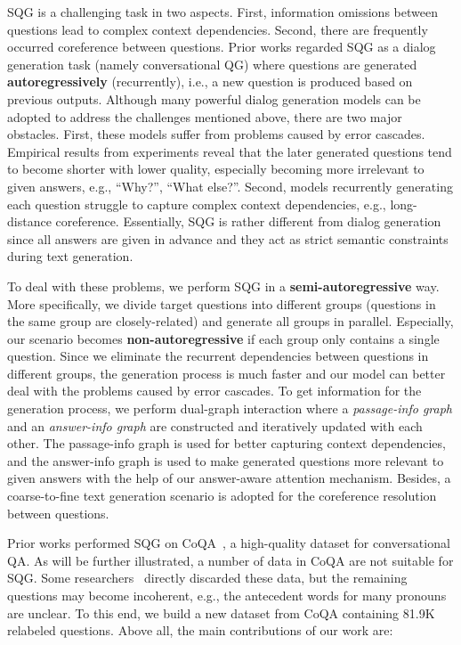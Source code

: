 \documentclass[11pt,a4paper]{article}
\begin{document}
SQG is a challenging task in two aspects. 
First, information omissions between questions lead to complex context dependencies. Second, there are frequently occurred  coreference between questions.
Prior works regarded SQG as a dialog generation task (namely conversational QG) where questions are generated \textbf{autoregressively} (recurrently), i.e., a new question is produced based on previous outputs.
Although many powerful dialog generation models can be adopted to address the challenges mentioned above, there are two major obstacles. First, these models suffer from problems caused by error cascades. Empirical results from experiments reveal that the later generated questions tend to become shorter with lower quality, especially becoming more irrelevant to given answers, e.g., ``Why?'', ``What else?''. Second, models recurrently generating each question struggle to capture complex context dependencies, e.g., long-distance coreference.
Essentially, SQG is rather different from dialog generation since all answers are given in advance and they act as strict semantic constraints during text generation.

To deal with these problems, we perform SQG in a \textbf{semi-autoregressive} way. More specifically, we divide target questions into different groups (questions in the same group are closely-related) and generate all groups in parallel. Especially, our scenario becomes \textbf{non-autoregressive} if each group only contains a single question. 
Since we eliminate the recurrent dependencies between questions in different groups, the generation process is much faster and our model can better deal with the problems caused by error cascades.
To get information for the generation process, we perform dual-graph interaction where a \textit{passage-info graph} and an \textit{answer-info graph} are constructed and iteratively updated with each other. The passage-info graph is used for better capturing context dependencies, and the answer-info graph is used to make generated questions more relevant to given answers with the help of our answer-aware attention mechanism. 
Besides, a coarse-to-fine text generation scenario is adopted for the coreference resolution between questions.

Prior works performed SQG on CoQA~\cite{reddy2019coqa}, a high-quality dataset for conversational QA. As will be further illustrated, a number of data in CoQA are not suitable for SQG. Some researchers~\cite{gao2019interconnected} directly discarded these data, but the remaining questions may become incoherent, e.g., the antecedent words for many pronouns are unclear. To this end, we build a new dataset from CoQA containing 81.9K relabeled questions. 
Above all, the main contributions of our work are:
\end{document}
